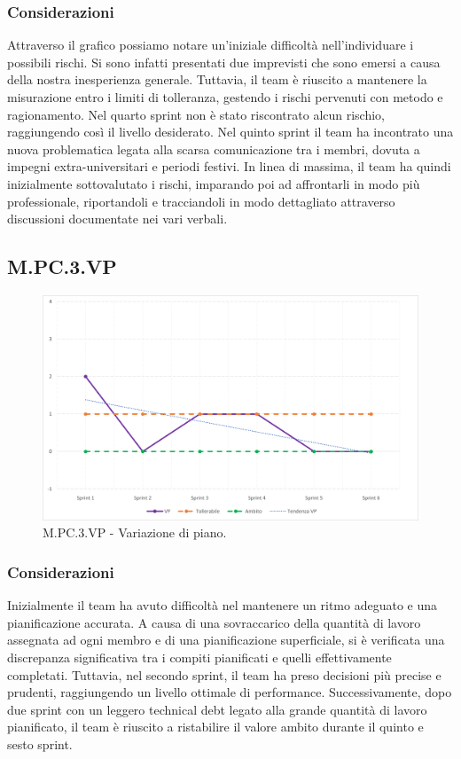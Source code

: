 \subsubsection{Considerazioni}
Attraverso il grafico possiamo notare un'iniziale difficoltà nell'individuare i possibili rischi.
Si sono infatti presentati due imprevisti che sono emersi a causa della nostra inesperienza generale.
Tuttavia, il team è riuscito a mantenere la misurazione entro i limiti di tolleranza, gestendo i rischi pervenuti con metodo e ragionamento.
Nel quarto sprint non è stato riscontrato alcun rischio, raggiungendo così il livello desiderato.
Nel quinto sprint il team ha incontrato una nuova problematica legata alla scarsa comunicazione tra i membri, dovuta a impegni extra-universitari e periodi festivi.
In linea di massima, il team ha quindi inizialmente sottovalutato i rischi, imparando poi ad affrontarli in modo più professionale, riportandoli e tracciandoli in modo dettagliato attraverso discussioni documentate nei vari verbali.
\subsection{M.PC.3.VP}
\begin{figure}[H]
\includegraphics[width=15.5cm]{img/metriche/MPC3VP.png}
\caption{M.PC.3.VP - Variazione di piano.}
\end{figure}
\subsubsection{Considerazioni}
Inizialmente il team ha avuto difficoltà nel mantenere un ritmo adeguato e una pianificazione accurata.
A causa di una sovraccarico della quantità di lavoro assegnata ad ogni membro e di una pianificazione superficiale, si è verificata una discrepanza significativa tra i compiti pianificati e quelli effettivamente completati.
Tuttavia, nel secondo sprint, il team ha preso decisioni più precise e prudenti, raggiungendo un livello ottimale di performance.
Successivamente, dopo due sprint con un leggero technical debt legato alla grande quantità di lavoro pianificato, il team è riuscito a ristabilire il valore ambito durante il quinto e sesto sprint.
